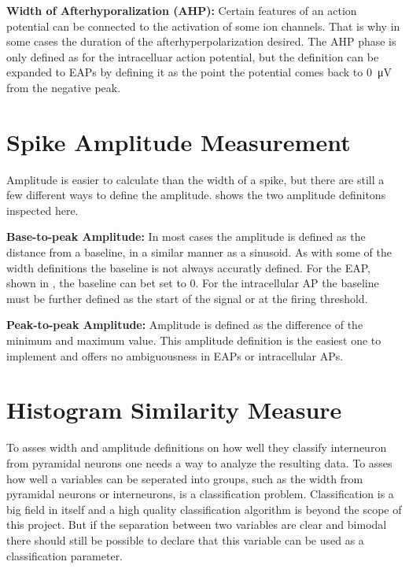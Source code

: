 \documentclass[altfont, fleqn]{uiophd}
\renewcommand{\cref}[1]{{\color{viridis_03}\mycref{#1}}}
\renewcommand{\Cref}[1]{{\color{viridis_03}\myCref{#1}}}
\begin{document}
\noindent 
{\bf Width of Afterhyporalization (AHP):} 
Certain features of an action potential can be connected
to the 
activation of some ion channels. 
That is why in some cases the duration of the afterhyperpolarization 
desired. 
The AHP phase is only defined as for the intracelluar action potential, 
but the definition can be expanded to EAPs by defining it as
the point the potential comes back to 
\SI{0}{\micro\volt}
from the negative peak. 
\newline

\section{Spike Amplitude Measurement}
Amplitude is easier to calculate than the width of a spike, 
but there are still a few different ways to define the amplitude. 
\Cref{fig:3_ap_eap} shows the two amplitude definitons inspected here. 
\newline

\noindent 
{\bf Base-to-peak Amplitude:} 
In most cases the amplitude is defined as the distance from a baseline,
in a similar manner as a sinusoid.
As with some of the width definitions the baseline is not always
accuratly defined. 
For the EAP, shown in \cref{fig:3_ap_eap}, the baseline can
bet set to 0. 
For the intracellular AP
the baseline must be further defined as the start of the
signal or at the firing threshold. 
\newline

\noindent 
{\bf Peak-to-peak Amplitude:} 
Amplitude is defined as the difference of 
the minimum and maximum value. 
This amplitude definition is the easiest one to implement and
offers no ambiguousness in EAPs or intracellular APs. 


\newpage
\section{Histogram Similarity Measure}
\label{sec:similarity_measure}
To asses width and amplitude definitions on how well they 
classify interneuron from pyramidal neurons
one needs a way to analyze the resulting data. 
To asses how well a variables can be seperated into groups,
such as the width from pyramidal neurons or 
interneurons,
is a classification problem. 
Classification is a big field in itself and 
a high quality classification algorithm is beyond the scope of this project. 
But if the separation between two variables are clear and bimodal
there should still be possible to declare that this variable can
be used as a classification parameter. 
\end{document}
